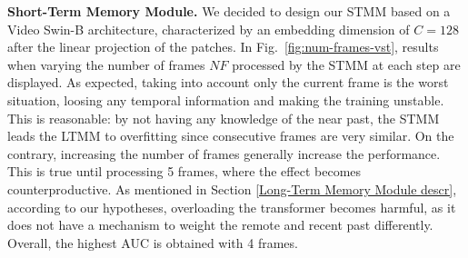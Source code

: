 \noindent\textbf{Short-Term Memory Module.}
\label{Short-Term Memory Module exp}
We decided to design our STMM based on a Video Swin-B architecture, characterized by an embedding dimension of $C = 128$ after the linear projection of the patches. %
In Fig.~\ref{fig:num-frames-vst}, results when varying the number of frames $\mathit{NF}$ processed by the STMM at each step are displayed.
As expected, taking into account only the current frame is the worst situation, loosing any temporal information and making the training unstable.
This is reasonable: by not having any knowledge of the near past, the STMM leads the LTMM to overfitting since consecutive frames are very similar.
On the contrary, increasing the number of frames generally increase the performance. 
This is true until processing 5 frames, where the effect becomes counterproductive.
As mentioned in Section \ref{Long-Term Memory Module descr}, according to our hypotheses, overloading the transformer becomes harmful, as it does not have a mechanism to weight the remote and recent past differently.
Overall, the highest AUC is obtained with 4 frames.

